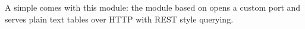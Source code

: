\documentclass[letterpaper,10pt,english]{sphinxmanual}
\begin{document}
A simple  comes with this module: the  module based on
 opens a custom port and serves plain text tables over
HTTP with REST style querying.



\renewcommand{\indexname}{Index}
\printindex
\end{document}
